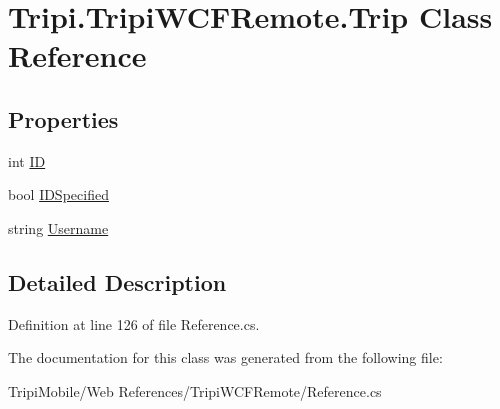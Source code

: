 \hypertarget{class_tripi_1_1_tripi_w_c_f_remote_1_1_trip}{
\section{Tripi.TripiWCFRemote.Trip Class Reference}
\label{class_tripi_1_1_tripi_w_c_f_remote_1_1_trip}
}


 
\subsection*{Properties}
\begin{DoxyCompactItemize}
\item 
\hypertarget{class_tripi_1_1_tripi_w_c_f_remote_1_1_trip_af840faab34277484ab4ac506a3f899ac}{
int \hyperlink{class_tripi_1_1_tripi_w_c_f_remote_1_1_trip_af840faab34277484ab4ac506a3f899ac}{ID}}
\label{class_tripi_1_1_tripi_w_c_f_remote_1_1_trip_af840faab34277484ab4ac506a3f899ac}

\begin{DoxyCompactList}\small\item\em \item\end{DoxyCompactList}\item 
\hypertarget{class_tripi_1_1_tripi_w_c_f_remote_1_1_trip_ac36b3aa1be08ff8f5c1bc1d3f8eae8df}{
bool \hyperlink{class_tripi_1_1_tripi_w_c_f_remote_1_1_trip_ac36b3aa1be08ff8f5c1bc1d3f8eae8df}{IDSpecified}}
\label{class_tripi_1_1_tripi_w_c_f_remote_1_1_trip_ac36b3aa1be08ff8f5c1bc1d3f8eae8df}

\begin{DoxyCompactList}\small\item\em \item\end{DoxyCompactList}\item 
\hypertarget{class_tripi_1_1_tripi_w_c_f_remote_1_1_trip_a71c7e08086db890705e559647d3ef31a}{
string \hyperlink{class_tripi_1_1_tripi_w_c_f_remote_1_1_trip_a71c7e08086db890705e559647d3ef31a}{Username}}
\label{class_tripi_1_1_tripi_w_c_f_remote_1_1_trip_a71c7e08086db890705e559647d3ef31a}

\begin{DoxyCompactList}\small\item\em \item\end{DoxyCompactList}\end{DoxyCompactItemize}


\subsection{Detailed Description}


Definition at line 126 of file Reference.cs.

The documentation for this class was generated from the following file:\begin{DoxyCompactItemize}
\item 
TripiMobile/Web References/TripiWCFRemote/Reference.cs\end{DoxyCompactItemize}
